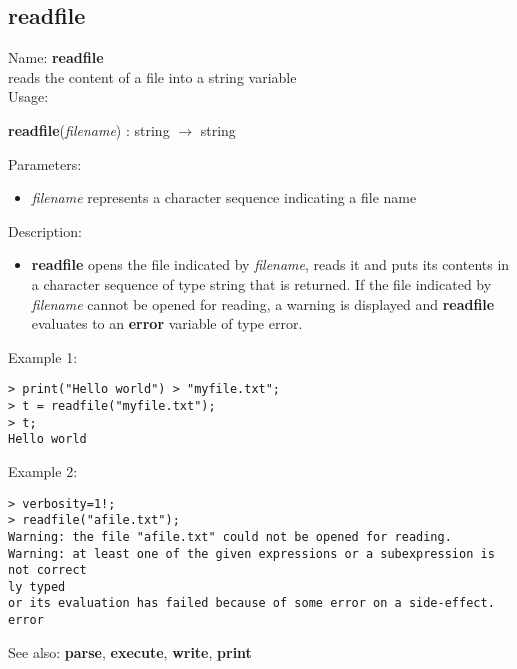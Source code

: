 \subsection{ readfile }
\noindent Name: \textbf{readfile}\\
reads the content of a file into a string variable\\

\noindent Usage: 
\begin{center}
\textbf{readfile}(\emph{filename}) : \textsf{string} $\rightarrow$ \textsf{string}\\
\end{center}
Parameters: 
\begin{itemize}
\item \emph{filename} represents a character sequence indicating a file name
\end{itemize}
\noindent Description: \begin{itemize}

\item \textbf{readfile} opens the file indicated by \emph{filename}, reads it and puts its
   contents in a character sequence of type \textsf{string} that is returned.
   If the file indicated by \emph{filename} cannot be opened for reading, a
   warning is displayed and \textbf{readfile} evaluates to an \textbf{error} variable of
   type \textsf{error}.
\end{itemize}
\noindent Example 1: 
\begin{center}\begin{minipage}{15cm}\begin{Verbatim}[frame=single]
> print("Hello world") > "myfile.txt";
> t = readfile("myfile.txt"); 
> t;
Hello world

\end{Verbatim}
\end{minipage}\end{center}
\noindent Example 2: 
\begin{center}\begin{minipage}{15cm}\begin{Verbatim}[frame=single]
> verbosity=1!;
> readfile("afile.txt");
Warning: the file "afile.txt" could not be opened for reading.
Warning: at least one of the given expressions or a subexpression is not correct
ly typed
or its evaluation has failed because of some error on a side-effect.
error
\end{Verbatim}
\end{minipage}\end{center}
See also: \textbf{parse}, \textbf{execute}, \textbf{write}, \textbf{print}
